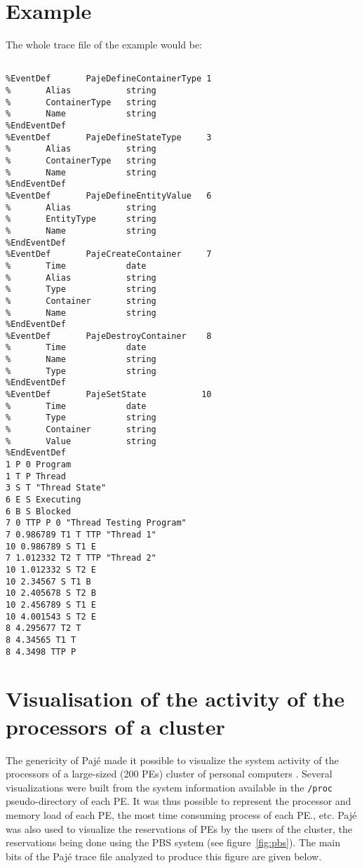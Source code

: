 \section{Example}
\label{sec:example}

The whole trace file of the example would be:

\begin{verbatim}

%EventDef       PajeDefineContainerType 1
%       Alias           string
%       ContainerType   string
%       Name            string
%EndEventDef
%EventDef       PajeDefineStateType     3
%       Alias           string
%       ContainerType   string
%       Name            string
%EndEventDef
%EventDef       PajeDefineEntityValue   6
%       Alias           string
%       EntityType      string
%       Name            string
%EndEventDef
%EventDef       PajeCreateContainer     7
%       Time            date
%       Alias           string
%       Type            string
%       Container       string
%       Name            string
%EndEventDef
%EventDef       PajeDestroyContainer    8
%       Time            date
%       Name            string
%       Type            string
%EndEventDef
%EventDef       PajeSetState           10
%       Time            date
%       Type            string
%       Container       string
%       Value           string
%EndEventDef
1 P 0 Program
1 T P Thread
3 S T "Thread State"
6 E S Executing
6 B S Blocked
7 0 TTP P 0 "Thread Testing Program"
7 0.986789 T1 T TTP "Thread 1"
10 0.986789 S T1 E
7 1.012332 T2 T TTP "Thread 2"
10 1.012332 S T2 E
10 2.34567 S T1 B
10 2.405678 S T2 B
10 2.456789 S T1 E
10 4.001543 S T2 E
8 4.295677 T2 T
8 4.34565 T1 T
8 4.3498 TTP P

\end{verbatim}


\section{Visualisation of the activity of the processors of a cluster}
\label{sec:admin}

The genericity of Pajé made it possible to visualize the system
activity of the processors of a large-sized (200 PEs) cluster of
personal computers \cite{GuilloudCAS:2001}. Several visualizations
were built from the system information available in the \texttt{/proc}
pseudo-directory of each PE. It was thus possible to represent the
processor and memory load of each PE, the most time consuming process
of each PE., etc. Pajé was also used to visualize the reservations of
PEs by the users of the cluster, the reservations being done using the
PBS system \cite{PBS} (see figure~\ref{fig:pbs}). The main bits of the
Pajé trace file analyzed to produce this figure are given below.

